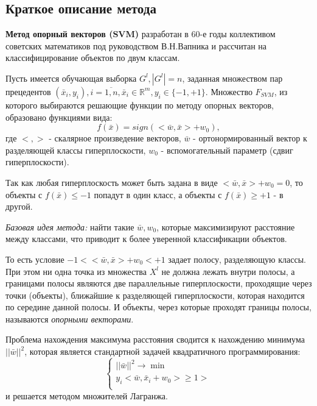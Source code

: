 \documentclass[12pt,a4paper]{article}
\begin{document}
\subsection{Краткое описание метода}
\textbf{Метод опорный векторов (SVM)} разработан в 60-е годы коллективом советских математиков под руководством В.Н.Вапника и рассчитан на классифицирование объектов по двум классам.

Пусть имеется обучающая выборка $G^l,|G^l|=n$, заданная множеством пар прецедентов $(\bar{x}_i,y_i),i=\overline{1,n},\bar{x}_i\in\mathbb{R}^m,y_i\in\{-1,+1\}$. Множество $F_{SVM}$, из которого выбираются решающие функции по методу опорных векторов, образовано функциями вида:
\begin{equation}
    f(\bar{x})=sign(<\bar{w},\bar{x}>+w_0),
\end{equation}
где $<,>$ - скалярное произведение векторов, $\bar{w}$ - ортонормированный вектор к разделяющей классы гиперплоскости, $w_0$ - вспомогательный параметр (сдвиг гиперплоскости).

Так как любая гиперплоскость может быть задана в виде $<\bar{w},\bar{x}>+w_0=0$, то объекты с $f(\bar{x})\leq-1$ попадут в один класс, а объекты с $f(\bar{x})\geq+1$ - в другой.

\textit{Базовая идея метода:} найти такие $\bar{w},w_0$, которые максимизируют расстояние между классами, что приводит к более уверенной классификации объектов.

То есть условие $-1<<\bar{w},\bar{x}>+w_0<+1$ задает полосу, разделяющую классы. При этом ни одна точка из множества $X^l$ не должна лежать внутри полосы, а границами полосы являются две параллельные гиперплоскости, проходящие через точки (объекты), ближайшие к разделяющей гиперплоскости, которая находится по середине данной полосы. И объекты, через которые проходят границы полосы, называются \textit{опорными векторами}.

Проблема нахождения максимума расстояния сводится к нахождению минимума $||\bar{w}||^2$, которая является стандартной задачей квадратичного программирования:
\begin{equation}
    \left\{
    \begin{array}{ll}
        ||\bar{w}||^2\rightarrow\min\\
        y_i<\bar{w},\bar{x}_i+w_0>\geq1>\\
    \end{array}
    \right.
\end{equation}
и решается методом множителей Лагранжа.
\end{document}

